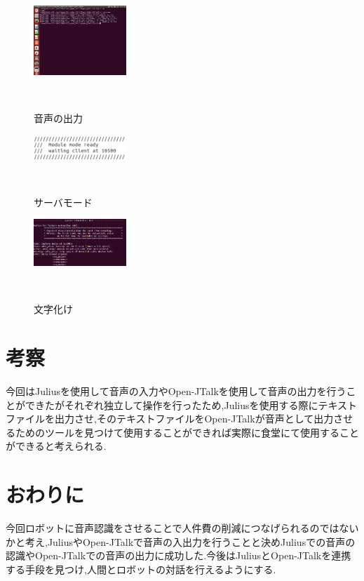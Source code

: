 \documentclass[a4paper]{jarticle}
\begin{document}
\begin{figure}[h]
 \begin{center}
  \includegraphics[width=35mm]{img/konpairu.png}
 　\caption{音声の出力}
 　\label{fig:konpairu}
 \end{center}
\end{figure}


\begin{figure}[h]
 \begin{center}
  \includegraphics[width=35mm]{img/sa-ba1.png}
 　\caption{サーバモード}
 　\label{fig:sa-ba-1}
 \end{center}
\end{figure}


\begin{figure}[h]
 \begin{center}
  \includegraphics[width=35mm]{img/moji.png}
 　\caption{文字化け}
 　\label{fig:moji}
 \end{center}
\end{figure}


\section{考察}
今回はJuliusを使用して音声の入力やOpen-JTalkを使用して音声の出力を行うことができたがそれぞれ独立して操作を行ったため,Juliusを使用する際にテキストファイルを出力させ,そのテキストファイルをOpen-JTalkが音声として出力させるためのツールを見つけて使用することができれば実際に食堂にて使用することができると考えられる.


\section{おわりに}
今回ロボットに音声認識をさせることで人件費の削減につなげられるのではないかと考え,JuliusやOpen-JTalkで音声の入出力を行うことと決めJuliusでの音声の認識やOpen-JTalkでの音声の出力に成功した.今後はJuliusとOpen-JTalkを連携する手段を見つけ,人間とロボットの対話を行えるようにする.
\end{document}
